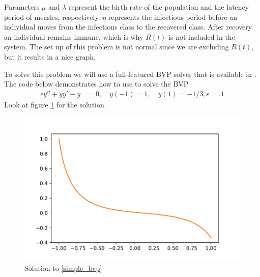 Parameters $\mu$ and $\lambda$ represent the birth rate of the population and the latency period of measles, respectively.
$\eta$ represents the infectious period before an individual moves from the infectious class to the recovered class.
After recovery an individual remains immune, which is why $R(t)$ is not included in the system.
The set up of this problem is not normal since we are excluding $R(t)$, but it results in a nice graph.

To solve this problem we will use a full-featured BVP solver that is available in .
The code below demonstrates how to use  to solve the BVP
\begin{align}\label{simple_bvp}
	\epsilon y'' + yy' - y &= 0, \quad y(-1) = 1, \quad y(1) = -1/3, \epsilon=.1
\end{align}
Look at figure \ref{bvp_ex} for the solution.

\begin{figure}
\centering
\includegraphics[width=\textwidth]{bvp_example.pdf}
\caption{Solution to \eqref{simple_bvp}}
\label{bvp_ex}
\end{figure}

